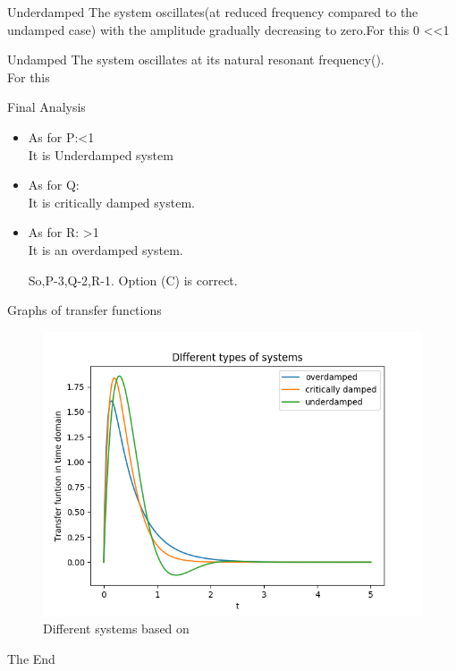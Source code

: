 \documentclass{beamer}
\begin{document}
\begin{frame}
\begin{block}{Underdamped}
The system oscillates(at reduced frequency compared to the undamped case) with the amplitude gradually decreasing to zero.For this 0 \textless\zeta\textless1
\end{block}
\begin{block}{Undamped}
The system oscillates at its natural resonant frequency().\\
For this 

\end{block}


    
\end{frame}

\begin{frame}{Final Analysis}
\begin{itemize}
\item As for P:\zeta \textless 1\\
It is Underdamped system
\item As for Q: \\
It is critically damped system.
\item As for R: \zeta \textgreater 1\\
It is an overdamped system.

\vspace{10mm}

So,P-3,Q-2,R-1. Option (C) is correct.




\end{itemize}
\end{frame}
\begin{frame}{Graphs of transfer functions}
\usepackage{graphicx}
\begin{figure}
    \centering
    \includegraphics[width=0.7\linewidth]{Damping.png}
    \caption{Different systems based on \zeta}
    \label{fig:Graph}
\end{figure}
\end{frame}

\begin{frame}
    

\huge{\centerline{The End}}
\end{frame}
\end{document}
